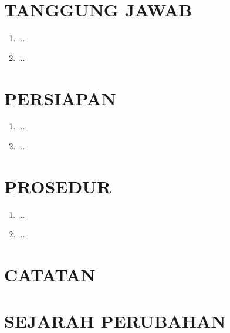 \documentclass[12pt]{etc.doc}
\begin{document}
    \section{TANGGUNG JAWAB}
    \begin{enumerate}
        \item ...
        \item ...
    \end{enumerate}

    \section{PERSIAPAN}
    \begin{enumerate}
        \item ...
        \item ...
    \end{enumerate}

    \section{PROSEDUR}
    \begin{enumerate}
        \item ...
        \item ...
    \end{enumerate}

    \section{CATATAN}

    \newpage

    \section*{SEJARAH PERUBAHAN}
\end{document}
